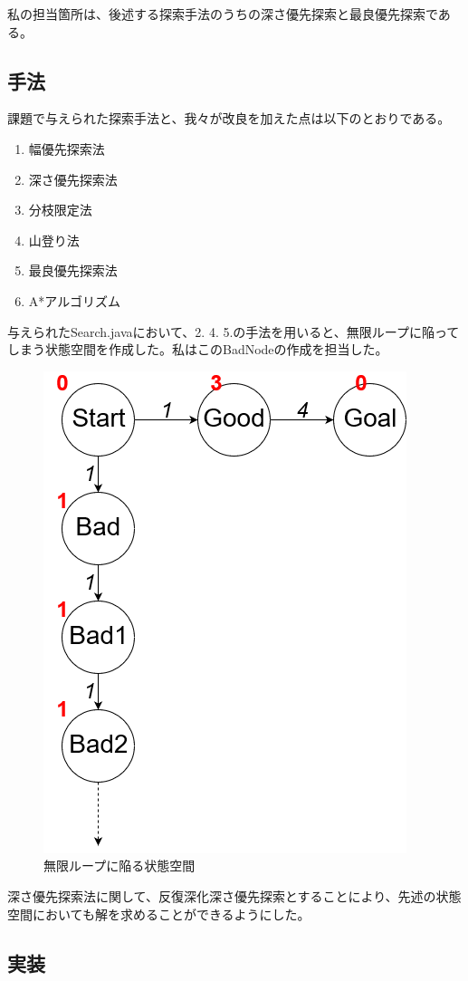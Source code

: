 \documentclass{jarticle}
\begin{document}
私の担当箇所は、後述する探索手法のうちの深さ優先探索と最良優先探索である。
\subsection{手法}
課題で与えられた探索手法と、我々が改良を加えた点は以下のとおりである。

\begin{enumerate}
\item 幅優先探索法
\item 深さ優先探索法
\item 分枝限定法
\item 山登り法
\item 最良優先探索法
\item A*アルゴリズム
\end{enumerate}

与えられたSearch.javaにおいて、2. 4. 5.の手法を用いると、無限ループに陥ってしまう状態空間を作成した。私はこのBadNodeの作成を担当した。\\

\begin{figure}[htbp]
\centering
\includegraphics[bb=0 0 401 532,width=0.6\linewidth]{Infinite.png}
\caption{無限ループに陥る状態空間}
\end{figure}


深さ優先探索法に関して、反復深化深さ優先探索とすることにより、先述の状態空間においても解を求めることができるようにした。

\subsection{実装}
\end{document}
